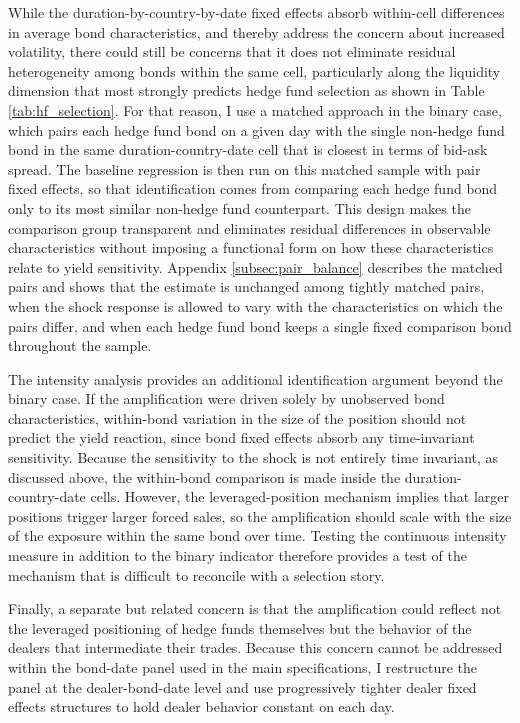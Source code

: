 \documentclass[english, 11pt, oneside]{article}
\begin{document}
While the duration-by-country-by-date fixed effects absorb within-cell differences in average bond characteristics, and thereby address the concern about increased volatility, there could still be concerns that it does not eliminate residual heterogeneity among bonds within the same cell, particularly along the liquidity dimension that most strongly predicts hedge fund selection as shown in Table \ref{tab:hf_selection}. For that reason, I use a matched approach in the binary case, which pairs each hedge fund bond on a given day with the single non-hedge fund bond in the same duration-country-date cell that is closest in terms of bid-ask spread. The baseline regression is then run on this matched sample with pair fixed effects, so that identification comes from comparing each hedge fund bond only to its most similar non-hedge fund counterpart. This design makes the comparison group transparent and eliminates residual differences in observable characteristics without imposing a functional form on how these characteristics relate to yield sensitivity. Appendix \ref{subsec:pair_balance} describes the matched pairs and shows that the estimate is unchanged among tightly matched pairs, when the shock response is allowed to vary with the characteristics on which the pairs differ, and when each hedge fund bond keeps a single fixed comparison bond throughout the sample.

The intensity analysis provides an additional identification argument beyond the binary case. If the amplification were driven solely by unobserved bond characteristics, within-bond variation in the size of the position should not predict the yield reaction, since bond fixed effects absorb any time-invariant sensitivity. Because the sensitivity to the shock is not entirely time invariant, as discussed above, the within-bond comparison is made inside the duration-country-date cells. However, the leveraged-position mechanism implies that larger positions trigger larger forced sales, so the amplification should scale with the size of the exposure within the same bond over time. Testing the continuous intensity measure in addition to the binary indicator therefore provides a test of the mechanism that is difficult to reconcile with a selection story.

Finally, a separate but related concern is that the amplification could reflect not the leveraged positioning of hedge funds themselves but the behavior of the dealers that intermediate their trades. Because this concern cannot be addressed within the bond-date panel used in the main specifications, I restructure the panel at the dealer-bond-date level and use progressively tighter dealer fixed effects structures to hold dealer behavior constant on each day.
\end{document}

